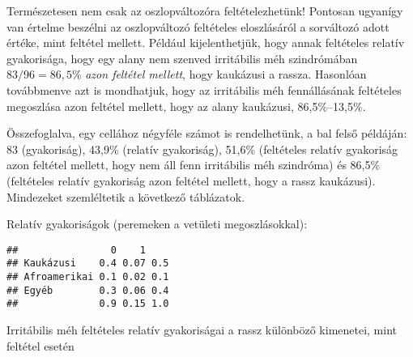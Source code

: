 \documentclass[]{book}
\newenvironment{Shaded}{\begin{snugshade}}{\end{snugshade}}
\newcommand{\DecValTok}[1]{\textcolor[rgb]{0.00,0.00,0.81}{#1}}
\newcommand{\KeywordTok}[1]{\textcolor[rgb]{0.13,0.29,0.53}{\textbf{#1}}}
\newcommand{\NormalTok}[1]{#1}
\newcommand{\OperatorTok}[1]{\textcolor[rgb]{0.81,0.36,0.00}{\textbf{#1}}}
\newcommand{\StringTok}[1]{\textcolor[rgb]{0.31,0.60,0.02}{#1}}
\begin{document}
Természetesen nem csak az oszlopváltozóra feltételezhetünk! Pontosan ugyanígy van értelme beszélni az oszlopváltozó feltételes eloszlásáról a sorváltozó adott értéke, mint feltétel mellett. Például kijelenthetjük, hogy annak feltételes relatív gyakorisága, hogy egy alany nem szenved irritábilis méh szindrómában \(83/96=86,\!5\)\% \emph{azon feltétel mellett}, hogy kaukázusi a rassza. Hasonlóan továbbmenve azt is mondhatjuk, hogy az irritábilis méh fennállásának feltételes megoszlása azon feltétel mellett, hogy az alany kaukázusi, 86,5\%--13,5\%.

Összefoglalva, egy cellához négyféle számot is rendelhetünk, a bal felső példáján: 83 (gyakoriság), 43,9\% (relatív gyakoriság), 51,6\% (feltételes relatív gyakoriság azon feltétel mellett, hogy nem áll fenn irritábilis méh szindróma) és 86,5\% (feltételes relatív gyakoriság azon feltétel mellett, hogy a rassz kaukázusi). Mindezeket szemléltetik a következő táblázatok.

Relatív gyakoriságok (peremeken a vetületi megoszlásokkal):

\begin{Shaded}
\end{Shaded}

\begin{verbatim}
##                0    1    
## Kaukázusi    0.4 0.07 0.5
## Afroamerikai 0.1 0.02 0.1
## Egyéb        0.3 0.06 0.4
##              0.9 0.15 1.0
\end{verbatim}

Irritábilis méh feltételes relatív gyakoriságai a rassz különböző kimenetei, mint feltétel esetén

\begin{Shaded}
\end{Shaded}
\end{document}
